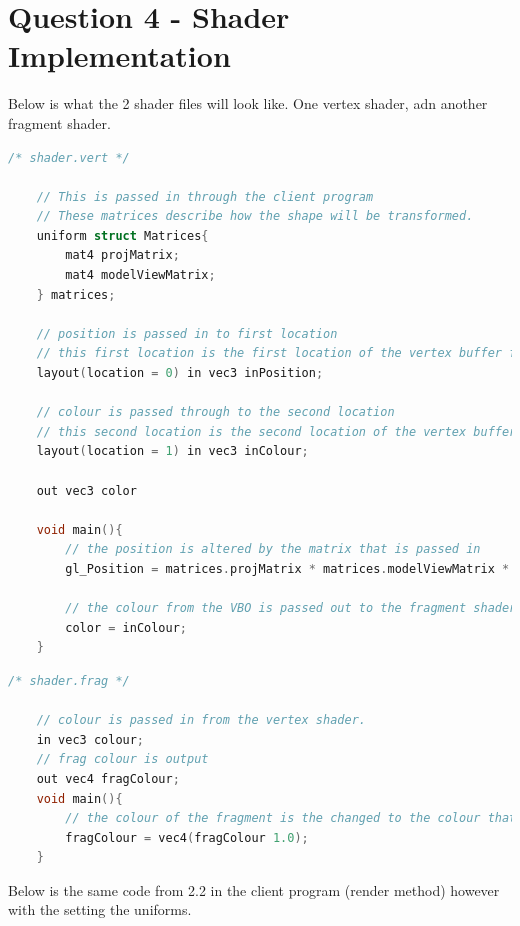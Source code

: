 \documentclass[10pt]{report}
\begin{document}
\chapter{Question 4 - Shader Implementation}

Below is what the 2 shader files will look like. One vertex shader, adn another fragment shader.

\begin{lstlisting}[language = c]
/* shader.vert */
    
    // This is passed in through the client program
    // These matrices describe how the shape will be transformed.
    uniform struct Matrices{
        mat4 projMatrix;
        mat4 modelViewMatrix;
    } matrices;

    // position is passed in to first location
    // this first location is the first location of the vertex buffer from the vao which contained the x y z
    layout(location = 0) in vec3 inPosition;

    // colour is passed through to the second location
    // this second location is the second location of the vertex buffer from the vao which contains the r g b
    layout(location = 1) in vec3 inColour;

    out vec3 color

    void main(){
        // the position is altered by the matrix that is passed in
        gl_Position = matrices.projMatrix * matrices.modelViewMatrix * vec4(inPosition, 1.0f);

        // the colour from the VBO is passed out to the fragment shader
        color = inColour;
    }
\end{lstlisting}

\begin{lstlisting}[language = c]
/* shader.frag */ 

    // colour is passed in from the vertex shader.
    in vec3 colour;
    // frag colour is output
    out vec4 fragColour;
    void main(){
        // the colour of the fragment is the changed to the colour that is passed in via the client via the vertex shader
        fragColour = vec4(fragColour 1.0);
    }

\end{lstlisting}

Below is the same code from 2.2 in the client program (render method) however with the setting the  uniforms.
\end{document}
